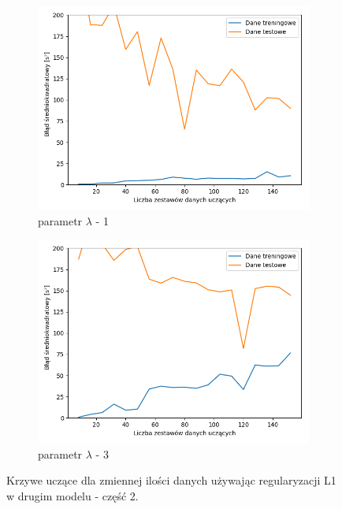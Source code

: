 \documentclass[12pt]{aghdpl}
\begin{document}
		\begin{figure}[h]
			\centering
		 	\begin{subfigure}{.8\linewidth}
		 		\includegraphics[width =\linewidth]{wykresy/6_regularyzacja/l1/regularyzacja_1_learning_curves.png}
		 		\caption{parametr $\lambda$ - 1}
		 	\end{subfigure}
		 	\begin{subfigure}{.8\linewidth}
		 		\includegraphics[width =\linewidth]{wykresy/6_regularyzacja/l1/regularyzacja_3_learning_curves.png}
		 		\caption{parametr $\lambda$ - 3}
		 	\end{subfigure}
		  	
		  	\caption{Krzywe uczące dla zmiennej ilości danych używając regularyzacji L1 w drugim modelu - część 2.}
			\label{fig: drugi_model_przy_regularyzacji_l1_learning_curves_2}
		\end{figure}
		 	
\end{document}
